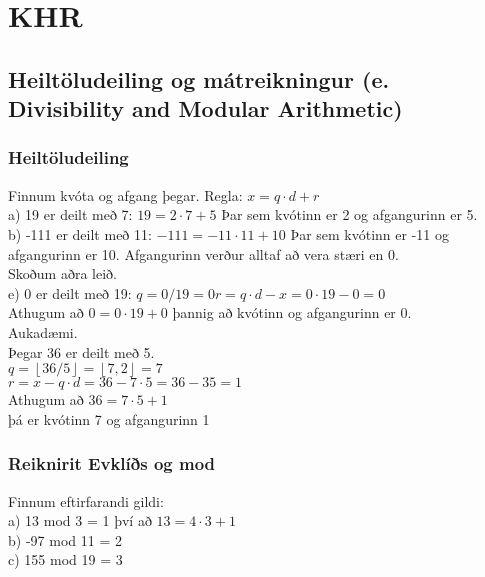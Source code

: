 \section{KHR}

\subsection{Heiltöludeiling og mátreikningur (e. Divisibility and Modular Arithmetic)}

\subsubsection{Heiltöludeiling}
Finnum kvóta og afgang þegar. \quad Regla: $x = q \cdot d + r$\\
a) 19 er deilt með 7: $19 = 2 \cdot 7 + 5$ Þar sem kvótinn er 2 og afgangurinn er 5.\\
b) -111 er deilt með 11: $-111 = -11 \cdot 11 + 10$ Þar sem kvótinn er -11 og afgangurinn er 10. Afgangurinn verður alltaf að vera stæri en 0.\vspace*{1em}\\
Skoðum aðra leið.\\
e) 0 er deilt með 19: $q = 0/19=0 r = q \cdot d - x = 0 \cdot 19 - 0 = 0$\\
Athugum að $0=0\cdot19+0$ þannig að kvótinn og afgangurinn er 0.\vspace*{1em}\\
Aukadæmi.\\
Þegar 36 er deilt með 5.\\
$q = \left\lfloor 36/5 \right\rfloor = \left\lfloor 7,2 \right\rfloor = 7$\\
$r = x -q \cdot d = 36- 7 \cdot 5 = 36 - 35 = 1$\\
Athugum að $36=7\cdot5+1$\\
þá er kvótinn 7 og afgangurinn 1
\subsubsection{Reiknirit Evklíðs og mod}
Finnum eftirfarandi gildi:\\
a) 13 mod 3 = 1 því að $13 = 4 \cdot 3 +1$\\
b) -97 mod 11 = 2\\
c) 155 mod 19 = 3

\newpage
\setcounter{subsection}{2}
